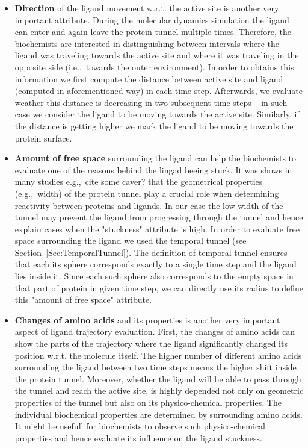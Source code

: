 \documentclass[twocolumn]{bmcart}%
\newcommand{\ie}{i.e.,~}
\newcommand{\eg}{e.g.,~}
\begin{document}
\begin{itemize}
\item \textbf{Direction} of the ligand movement w.r.t. the active site is another very important attribute. 
During the molecular dynamics simulation the ligand can enter and again leave the protein tunnel multiple times. 
Therefore, the biochemists are interested in distinguishing between intervals where the ligand was traveling towards the active site and where it was traveling in the opposite side (\ie towards the outer environment). 
In order to obtains this information we first compute the distance between active site and ligand (computed in aforementioned way) in each time step. 
Afterwards, we evaluate weather this distance is decreasing in two subsequent time steps -- in such case we consider the ligand to be moving towards the active site. 
Similarly, if the distance is getting higher we mark the ligand to be moving towards the protein surface.        

\item \textbf{Amount of free space} surrounding the ligand can help the biochemists to evaluate one of the reasons behind the lingad beeing stuck. 
It was shows in many studies {\color{red}\eg cite some caver?} that the geometrical properties (\eg width) of the protein tunnel play a crucial role when determining reactivity between proteins and ligands. 
In our case the low width of the tunnel may prevent the ligand from progressing through the tunnel and hence explain cases when the "stuckness" attribute is high. 
In order to evaluate free space surrounding the ligand we used the temporal tunnel (see Section~\ref{Sec:TemporalTunnel}). 
The definition of temporal tunnel ensures that each its sphere corresponds exactly to a single time step and the ligand lies inside it. 
Since each such sphere also corresponds to the empty space in that part of protein in given time step, we can directly use its radius to define this "amount of free space" attribute. 

\item \textbf{Changes of amino acids} and its properties is another very important aspect of ligand trajectory evaluation.
First, the changes of amino acids can show the parts of the trajectory where the ligand  significantly changed its position w.r.t. the molecule itself. 
The higher number of different amino acids surrounding the ligand between two time steps means the higher shift inside the protein tunnel.
Moreover, whether the ligand will be able to pass through the tunnel and reach the active site, is highly depended not only on geometric properties of the tunnel but also on its physico-chemical properties.
The individual biochemical properties are determined by surrounding amino acids.
It might be usefull for biochemists to observe such physico-chemical properties and hence evaluate its influence on the ligand stuckness.   


\end{itemize}
\end{document}
